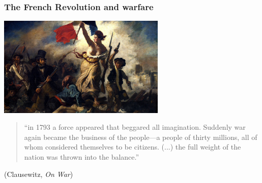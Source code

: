 \documentclass[aspectratio=43]{beamer}
\begin{document}
%
%

\begin{frame}
\frametitle{The French Revolution and warfare}
\centering

\includegraphics[width = 0.6\textwidth]{img/delacroix}


\vspace{15pt}

\begin{quote}
  {\small ``in 1793 a force appeared that beggared all imagination. Suddenly war again became the business of the people---a people of thirty millions, all of whom considered themselves to be citizens. (...) the full weight of the nation was thrown into the balance.''}
\end{quote}

{\small (Clausewitz, \textit{On War})}

\end{frame}
\end{document}
